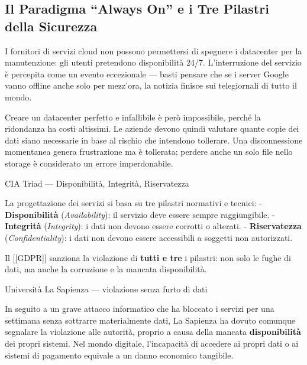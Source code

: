 \documentclass[
  italian,
  openany]{book}
\begin{document}
\subsection{Il Paradigma ``Always On'' e i Tre Pilastri della
Sicurezza}\label{il-paradigma-always-on-e-i-tre-pilastri-della-sicurezza}

I fornitori di servizi cloud non possono permettersi di spegnere i
datacenter per la manutenzione: gli utenti pretendono disponibilità
24/7. L'interruzione del servizio è percepita come un evento eccezionale
--- basti pensare che se i server Google vanno offline anche solo per
mezz'ora, la notizia finisce sui telegiornali di tutto il mondo.

Creare un datacenter perfetto e infallibile è però impossibile, perché
la ridondanza ha costi altissimi. Le aziende devono quindi valutare
quante copie dei dati siano necessarie in base al rischio che intendono
tollerare. Una disconnessione momentanea genera frustrazione ma è
tollerata; perdere anche un solo file nello storage è considerato un
errore imperdonabile.

\begin{calloutdefinition}{CIA Triad — Disponibilità, Integrità, Riservatezza}

La progettazione dei servizi si basa su tre pilastri normativi e
tecnici: - \textbf{Disponibilità} (\emph{Availability}): il servizio
deve essere sempre raggiungibile. - \textbf{Integrità}
(\emph{Integrity}): i dati non devono essere corrotti o alterati. -
\textbf{Riservatezza} (\emph{Confidentiality}): i dati non devono essere
accessibili a soggetti non autorizzati.

Il {[}{[}GDPR{]}{]} sanziona la violazione di \textbf{tutti e tre} i
pilastri: non solo le fughe di dati, ma anche la corruzione e la mancata
disponibilità.

\end{calloutdefinition}

\begin{callouttip}{Università La Sapienza — violazione senza furto di dati}

In seguito a un grave attacco informatico che ha bloccato i servizi per
una settimana senza sottrarre materialmente dati, La Sapienza ha dovuto
comunque segnalare la violazione alle autorità, proprio a causa della
mancata \textbf{disponibilità} dei propri sistemi. Nel mondo digitale,
l'incapacità di accedere ai propri dati o ai sistemi di pagamento
equivale a un danno economico tangibile.

\end{callouttip}
\end{document}
